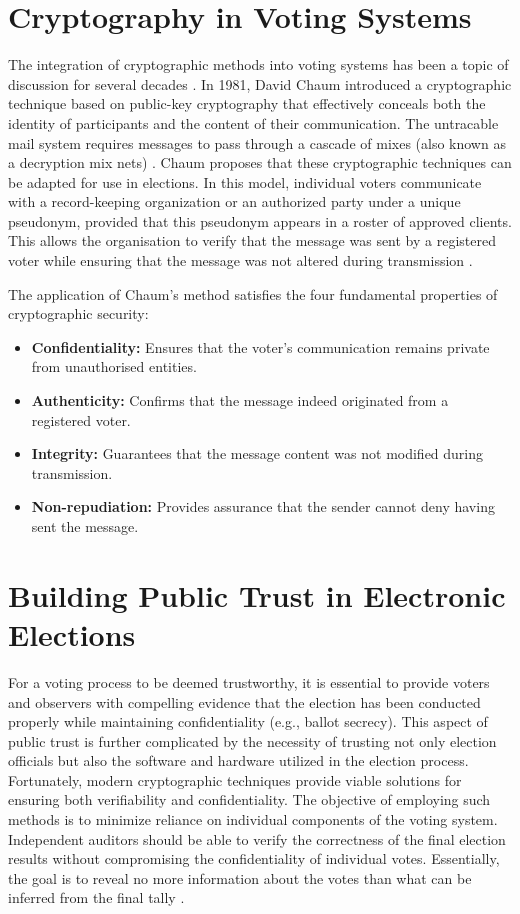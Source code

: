 \section{Cryptography in Voting Systems}
The integration of cryptographic methods into voting systems has been a topic of discussion for several decades \cite[6]{stuve-study}. In 1981, David Chaum introduced a cryptographic technique based on public-key cryptography that effectively conceals both the identity of participants and the content of their communication. The untracable mail system requires messages to pass through a cascade of mixes (also known as a decryption mix nets) \cite[86]{chaum} \cite[84]{stuve-study}. Chaum proposes that these cryptographic techniques can be adapted for use in elections. In this model, individual voters communicate with a record-keeping organization or an authorized party under a unique pseudonym, provided that this pseudonym appears in a roster of approved clients. This allows the organisation to verify that the message was sent by a registered voter while ensuring that the message was not altered during transmission \cite[84]{chaum}.

The application of Chaum's method satisfies the four fundamental properties of cryptographic security:
\begin{itemize}
    \item \textbf{Confidentiality:} Ensures that the voter’s communication remains private from unauthorised entities.
    \item \textbf{Authenticity:} Confirms that the message indeed originated from a registered voter.
    \item \textbf{Integrity:} Guarantees that the message content was not modified during transmission.
    \item \textbf{Non-repudiation:} Provides assurance that the sender cannot deny having sent the message.
\end{itemize}

\section{Building Public Trust in Electronic Elections}
For a voting process to be deemed trustworthy, it is essential to provide voters and observers with compelling evidence that the election has been conducted properly while maintaining confidentiality (e.g., ballot secrecy). This aspect of public trust is further complicated by the necessity of trusting not only election officials but also the software and hardware utilized in the election process. Fortunately, modern cryptographic techniques provide viable solutions for ensuring both verifiability and confidentiality. The objective of employing such methods is to minimize reliance on individual components of the voting system. Independent auditors should be able to verify the correctness of the final election results without compromising the confidentiality of individual votes. Essentially, the goal is to reveal no more information about the votes than what can be inferred from the final tally \cite[6, 10]{stuve-study}.

